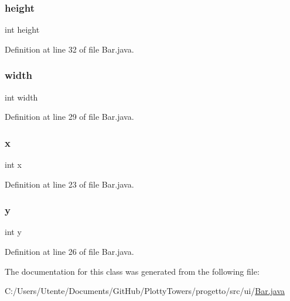 \subsubsection{\texorpdfstring{height}{height}}
{\footnotesize\ttfamily int height\hspace{0.3cm}{\ttfamily [protected]}}



Definition at line 32 of file Bar.\+java.

\mbox{\label{classui_1_1_bar_a2474a5474cbff19523a51eb1de01cda4}} 
\subsubsection{\texorpdfstring{width}{width}}
{\footnotesize\ttfamily int width\hspace{0.3cm}{\ttfamily [protected]}}



Definition at line 29 of file Bar.\+java.

\mbox{\label{classui_1_1_bar_a6150e0515f7202e2fb518f7206ed97dc}} 
\subsubsection{\texorpdfstring{x}{x}}
{\footnotesize\ttfamily int x\hspace{0.3cm}{\ttfamily [protected]}}



Definition at line 23 of file Bar.\+java.

\mbox{\label{classui_1_1_bar_a0a2f84ed7838f07779ae24c5a9086d33}} 
\subsubsection{\texorpdfstring{y}{y}}
{\footnotesize\ttfamily int y\hspace{0.3cm}{\ttfamily [protected]}}



Definition at line 26 of file Bar.\+java.



The documentation for this class was generated from the following file\+:\begin{DoxyCompactItemize}
\item 
C\+:/\+Users/\+Utente/\+Documents/\+Git\+Hub/\+Plotty\+Towers/progetto/src/ui/\hyperlink{_bar_8java}{Bar.\+java}\end{DoxyCompactItemize}
